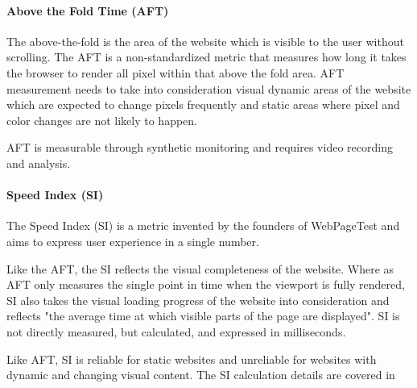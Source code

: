 \paragraph{Above the Fold Time (AFT)}

The above-the-fold is the area of the website which is visible to the user without scrolling.
The AFT is a non-standardized metric that measures how long it takes the browser to render all pixel within that above the fold area. %
AFT measurement needs to take into consideration visual dynamic areas of the website which are expected to change pixels frequently and static areas where pixel and color changes are not likely to happen. %

AFT is measurable through synthetic monitoring and requires video recording and analysis. %





\paragraph{Speed Index (SI)}

The Speed Index (SI) is a metric invented by the founders of WebPageTest and aims to express user experience in a single number. %

Like the AFT, the SI reflects the visual completeness of the website.
Where as AFT only measures the single point in time when the viewport is fully rendered, SI also takes the visual loading progress of the website into consideration and reflects "the average time at which visible parts of the page are displayed". %
SI is not directly measured, but calculated, and expressed in milliseconds. %

Like AFT, SI is reliable for static websites and unreliable for websites with dynamic and changing visual content. %
The SI calculation details are covered in %





